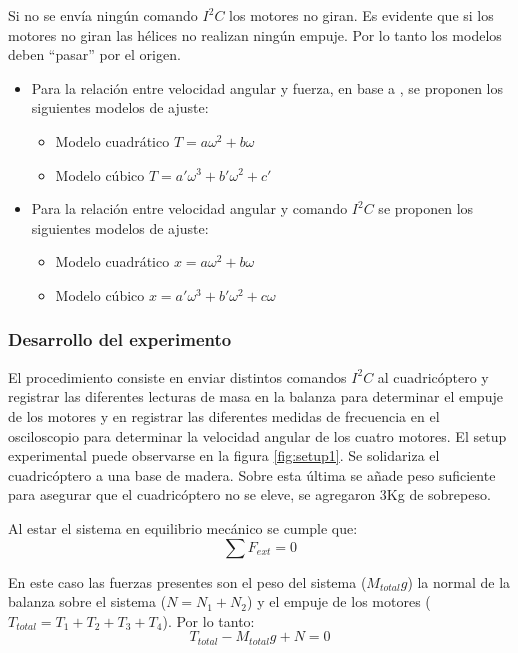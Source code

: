 \documentclass[main]{subfiles}
\begin{document}
Si no se env\'ia ning\'un comando $I^2C$ los motores no giran. Es evidente que si los motores no giran las h\'elices no realizan ning\'un empuje. Por lo tanto los modelos deben ``pasar'' por el origen. 
\begin{itemize}


\item Para la relaci\'on entre velocidad angular y fuerza, en base a \cite{bib:fuerzas-helices}, se proponen los siguientes modelos de ajuste:

	\begin{itemize}
	\item Modelo cuadr\'atico $T=a\omega^2+b\omega$
	\item Modelo c\'ubico $T=a\prime \omega^3+b\prime \omega^2+c\prime$
	\end{itemize}

\item Para la relaci\'on entre velocidad angular y comando $I^2C$ se proponen los siguientes modelos de ajuste:
	\begin{itemize}
	\item Modelo cuadr\'atico $x=a\omega^2+b\omega$
	\item Modelo c\'ubico $x =a\prime \omega^3+b\prime \omega^2+c\omega$	
	
	\end{itemize}


\end{itemize}

\subsubsection*{Desarrollo del experimento}
El procedimiento consiste en enviar distintos comandos $I^2C$ al cuadric\'optero y registrar las diferentes lecturas de masa en la balanza para determinar el empuje de los motores y en registrar las diferentes medidas de frecuencia en el osciloscopio para determinar la velocidad angular de los cuatro motores.
El setup experimental puede observarse en la figura \ref{fig:setup1}.
Se solidariza el cuadric\'optero a una base de madera. Sobre esta \'ultima se a\~nade peso suficiente para asegurar que el cuadric\'optero no se eleve, se agregaron 3Kg de sobrepeso.


	
Al estar el sistema en equilibrio mec\'anico se cumple que:
\begin{equation}
\sum F_{ext}=0
\end{equation}

En este caso las fuerzas presentes son el peso del sistema ($M_{total}g$) la normal de la balanza sobre el sistema ($N=N_1+N_2$) y el empuje de los motores ($T_{total}=T_1+T_2+T_3+T_4$). Por lo tanto:
\begin{equation}
T_{total}-M_{total}g+N=0
\end{equation}\\
\end{document}
